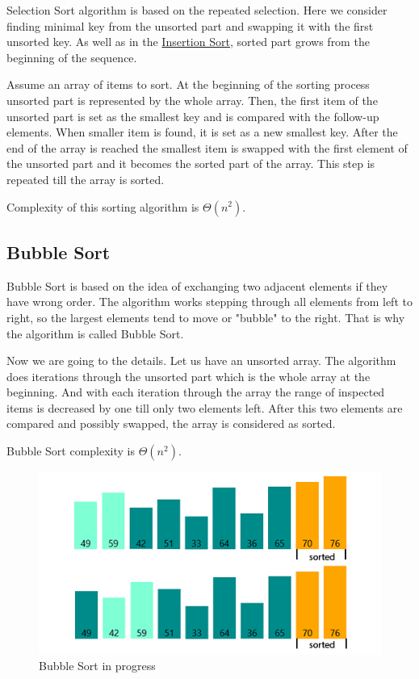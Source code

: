 \documentclass[
  field=inf,
  biblatex,
  language=english,
  glossaries,
  index
]{kidiplom}
\begin{document}
Selection Sort algorithm is based on the repeated selection. Here we consider finding minimal key from the unsorted part and swapping it with the first unsorted key. As well as in the \hyperref[sec:insertion]{Insertion Sort}, sorted part grows from the beginning of the sequence.

Assume an array of items to sort. At the beginning of the sorting process unsorted part is represented by the whole array. Then, the first item of the unsorted part is set as the smallest key and is compared with the follow-up elements. When smaller item is found, it is set as a new smallest key. After the end of the array is reached the smallest item is swapped with the first element of the unsorted part and it becomes the sorted part of the array. This step is repeated till the array is sorted.

Complexity of this sorting algorithm is $\Theta(n^2)$.

\subsection{Bubble Sort}
\label{sec:bubble}
Bubble Sort is based on the idea of exchanging two adjacent elements if they have wrong order. The algorithm works stepping through all elements from left to right, so the largest elements tend to move or "bubble" to the right. That is why the algorithm is called Bubble Sort.

Now we are going to the details. Let us have an unsorted array. The algorithm does iterations through the unsorted part which is the whole array at the beginning. And with each iteration through the array the range of inspected items is decreased by one till only two elements left. After this two elements are compared and possibly swapped, the array is considered as sorted.

Bubble Sort complexity is $\Theta(n^2)$.

\begin{figure}[H]
\begin{center}
	
	\includegraphics[scale=0.7]{img/Bubblesort.png}
	\caption{Bubble Sort in progress}\label{fig:bubble}
\end{center}
\end{figure}
\end{document}
